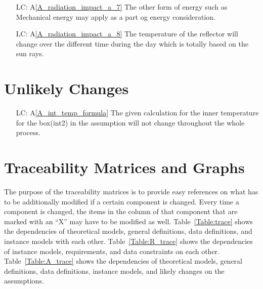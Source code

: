 \documentclass[12pt]{article}
\newcommand{\aref}[1]{A\ref{#1}}
\newcounter{lcnum} %
\begin{document}
\noindent \begin{itemize}

\item[LC\refstepcounter{lcnum}\thelcnum\label{LC_1}:] \aref{A_radiation_impact_a_7} 
The other form of energy such as Mechanical energy may apply as a part og energy consideration.

\item[LC\refstepcounter{lcnum}\thelcnum\label{LC_2}:] \aref{A_radiation_impact_a_8} 
The temperature of the reflector will change over the different time during the day which is totally based on the sun rays. 

\end{itemize}

\section{Unlikely Changes}    

\noindent \begin{itemize}

\item[LC\refstepcounter{lcnum}\thelcnum\label{LC_3}:] 
\aref{A_int_temp_formula} 
The given calculation for the inner temperature for the box(int2) in the assumption will not change throughout the whole process. 

\end{itemize}

\section{Traceability Matrices and Graphs}

The purpose of the traceability matrices is to provide easy references on what
has to be additionally modified if a certain component is changed.  Every time a
component is changed, the items in the column of that component that are marked
with an ``X'' may have to be modified as well.  Table~\ref{Table:trace} shows the
dependencies of theoretical models, general definitions, data definitions, and
instance models with each other. Table~\ref{Table:R_trace} shows the
dependencies of instance models, requirements, and data constraints on each
other. Table~\ref{Table:A_trace} shows the dependencies of theoretical models,
general definitions, data definitions, instance models, and likely changes on
the assumptions.

~\newline
\end{document}
